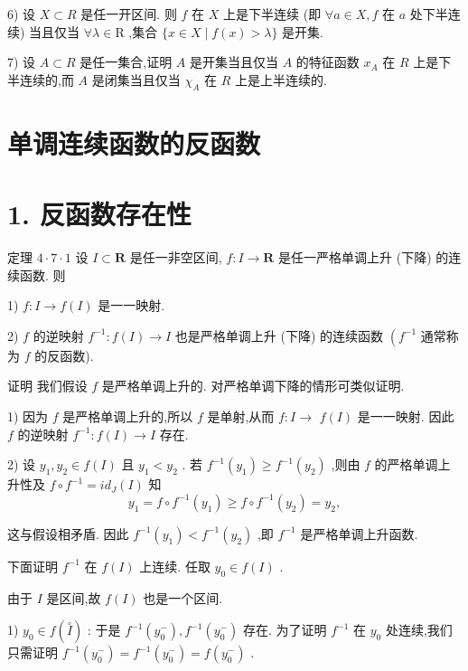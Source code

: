 6) 设 $X \subset  R$ 是任一开区间. 则 $f$ 在 $X$ 上是下半连续 (即 $\forall a \in  X,f$ 在 $a$ 处下半连续) 当且仅当 $\forall \lambda  \in  \mathrm{R}$ ,集合 $\{ x \in  X \mid  f\left( x\right)  > \lambda \}$ 是开集.

7) 设 $A \subset  R$ 是任一集合,证明 $A$ 是开集当且仅当 $A$ 的特征函数 ${x}_{A}$ 在 $R$ 上是下半连续的,而 $A$ 是闭集当且仅当 ${\chi }_{A}$ 在 $R$ 上是上半连续的.

\section{单调连续函数的反函数}

\section*{1. 反函数存在性}

定理 $4 \cdot  7 \cdot  1$ 设 $I \subset  \mathbf{R}$ 是任一非空区间, $f : I \rightarrow  \mathbf{R}$ 是任一严格单调上升 (下降) 的连续函数. 则

1) $f : I \rightarrow  f\left( I\right)$ 是一一映射.

2) $f$ 的逆映射 ${f}^{-1} : f\left( I\right)  \rightarrow  I$ 也是严格单调上升 (下降) 的连续函数 $\left( {f}^{-1}\right.$ 通常称为 $f$ 的反函数).

证明 我们假设 $f$ 是严格单调上升的. 对严格单调下降的情形可类似证明.

1) 因为 $f$ 是严格单调上升的,所以 $f$ 是单射,从而 $f : I \rightarrow$  $f\left( I\right)$ 是一一映射. 因此 $f$ 的逆映射 ${f}^{-1} : f\left( I\right)  \rightarrow  I$ 存在.

2) 设 ${y}_{1},{y}_{2} \in  f\left( I\right)$ 且 ${y}_{1} < {y}_{2}$ . 若 ${f}^{-1}\left( {y}_{1}\right)  \geq  {f}^{-1}\left( {y}_{2}\right)$ ,则由 $f$ 的严格单调上升性及 $f \circ  {f}^{-1} = i{d}_{J}\left( I\right)$ 知
$${y}_{1} = f \circ  {f}^{-1}\left( {y}_{1}\right)  \geq  f \circ  {f}^{-1}\left( {y}_{2}\right)  = {y}_{2},$$

这与假设相矛盾. 因此 ${f}^{-1}\left( {y}_{1}\right)  < {f}^{-1}\left( {y}_{2}\right)$ ,即 ${f}^{-1}$ 是严格单调上升函数.

下面证明 ${f}^{-1}$ 在 $f\left( I\right)$ 上连续. 任取 ${y}_{0} \in  f\left( I\right)$ .

由于 $I$ 是区间,故 $f\left( I\right)$ 也是一个区间.

1) ${y}_{0} \in  f\left( \overset{ \circ  }{I}\right)$ : 于是 ${f}^{-1}\left( {y}_{0}^{ - }\right) ,{f}^{-1}\left( {y}_{0}^{ - }\right)$ 存在. 为了证明 ${f}^{-1}$ 在 ${y}_{0}$ 处连续,我们只需证明 ${f}^{-1}\left( {y}_{0}^{ - }\right)  = {f}^{-1}\left( {y}_{0}^{ - }\right)  = f\left( {y}_{0}^{ - }\right)$ .

